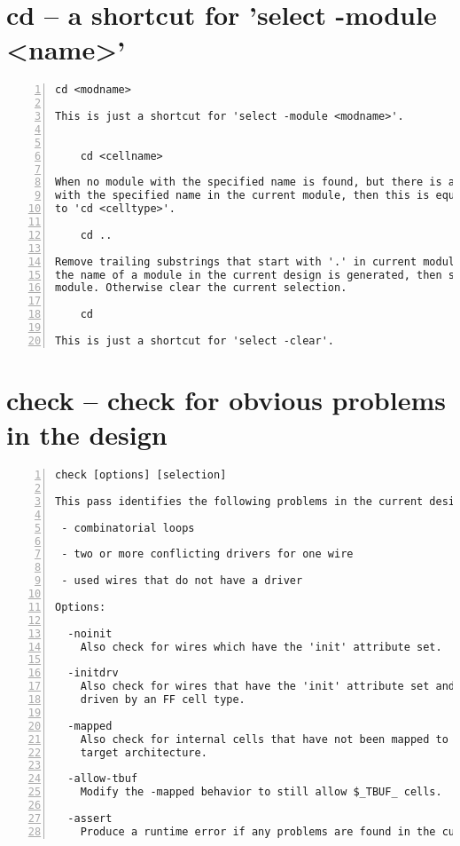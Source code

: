 \section{cd -- a shortcut for 'select -module <name>'}
\label{cmd:cd}
\begin{lstlisting}[numbers=left,frame=single]
    cd <modname>

This is just a shortcut for 'select -module <modname>'.


    cd <cellname>

When no module with the specified name is found, but there is a cell
with the specified name in the current module, then this is equivalent
to 'cd <celltype>'.

    cd ..

Remove trailing substrings that start with '.' in current module name until
the name of a module in the current design is generated, then switch to that
module. Otherwise clear the current selection.

    cd

This is just a shortcut for 'select -clear'.
\end{lstlisting}

\section{check -- check for obvious problems in the design}
\label{cmd:check}
\begin{lstlisting}[numbers=left,frame=single]
    check [options] [selection]

This pass identifies the following problems in the current design:

 - combinatorial loops

 - two or more conflicting drivers for one wire

 - used wires that do not have a driver

Options:

  -noinit
    Also check for wires which have the 'init' attribute set.

  -initdrv
    Also check for wires that have the 'init' attribute set and are not
    driven by an FF cell type.

  -mapped
    Also check for internal cells that have not been mapped to cells of the
    target architecture.

  -allow-tbuf
    Modify the -mapped behavior to still allow $_TBUF_ cells.

  -assert
    Produce a runtime error if any problems are found in the current design.
\end{lstlisting}

